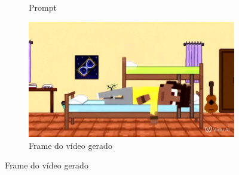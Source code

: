 \begin{figure}[htbp]
\begin{subfigure}{0.35\linewidth}
        \caption{\small Prompt}
        \label{fig:vidu8a}
    \end{subfigure}
    \begin{subfigure}{0.55\linewidth}
        \includegraphics[width=1\linewidth]{figs/vidu/frame8.jpg}
        \caption{\small Frame do vídeo gerado}
        \label{fig:vidu8b}
    \end{subfigure}
\end{figure}

